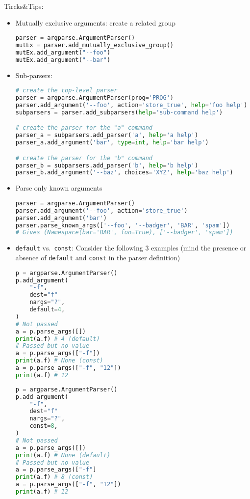 \documentclass[a4paper,12pt,%
              final%
              ]{article}
\begin{document}
Tircks\&Tips:
\begin{itemize}
  \item Mutually exclusive arguments: create a related group
\begin{lstlisting}[language=python]
parser = argparse.ArgumentParser()
mutEx = parser.add_mutually_exclusive_group()
mutEx.add_argument("--foo")
mutEx.add_argument("--bar")
\end{lstlisting}
  \item Sub-parsers:
\begin{lstlisting}[language=python]
# create the top-level parser
parser = argparse.ArgumentParser(prog='PROG')
parser.add_argument('--foo', action='store_true', help='foo help')
subparsers = parser.add_subparsers(help='sub-command help')

# create the parser for the "a" command
parser_a = subparsers.add_parser('a', help='a help')
parser_a.add_argument('bar', type=int, help='bar help')

# create the parser for the "b" command
parser_b = subparsers.add_parser('b', help='b help')
parser_b.add_argument('--baz', choices='XYZ', help='baz help')
\end{lstlisting}
  \item Parse only known arguments
\begin{lstlisting}[language=python]
parser = argparse.ArgumentParser()
parser.add_argument('--foo', action='store_true')
parser.add_argument('bar')
parser.parse_known_args(['--foo', '--badger', 'BAR', 'spam'])
# Gives (Namespace(bar='BAR', foo=True), ['--badger', 'spam'])
\end{lstlisting}
  \item \texttt{default} vs.\ \texttt{const}: Consider the following 3 examples (mind the presence or absence of \texttt{default} and \texttt{const} in the parser definition)

    \begin{minipage}[T]{.45\textwidth}
      \begin{lstlisting}[language=python,frame=single]
p = argparse.ArgumentParser()
p.add_argument(
    "-f",
    dest="f"
    nargs="?",
    default=4,
)
# Not passed
a = p.parse_args([])
print(a.f) # 4 (default)
# Passed but no value
a = p.parse_args(["-f"])
print(a.f) # None (const)
a = p.parse_args(["-f", "12"])
print(a.f) # 12
      \end{lstlisting}
    \end{minipage}\hfill%
    \begin{minipage}[T]{.45\textwidth}
      \begin{lstlisting}[language=python, frame=single]
p = argparse.ArgumentParser()
p.add_argument(
    "-f",
    dest="f"
    nargs="?",
    const=8,
)
# Not passed
a = p.parse_args([])
print(a.f) # None (default)
# Passed but no value
a = p.parse_args(["-f"]
print(a.f) # 8 (const)
a = p.parse_args(["-f", "12"])
print(a.f) # 12
      \end{lstlisting}
    \end{minipage}


\end{itemize}
\end{document}
